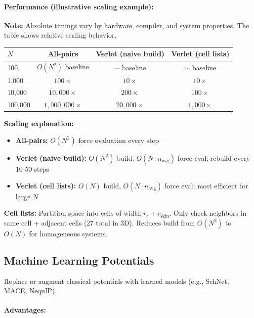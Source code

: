 \documentclass[11pt]{article}
\begin{document}
\paragraph{Performance (illustrative scaling example):}

\textbf{Note:} Absolute timings vary by hardware, compiler, and system properties. The table shows relative scaling behavior.

\begin{center}
\begin{tabular}{lccc}
\toprule
$N$ & All-pairs & Verlet (naive build) & Verlet (cell lists) \\
\midrule
100 & $O(N^2)$ baseline & $\sim$ baseline & $\sim$ baseline \\
1,000 & $100\times$ & $10\times$ & $10\times$ \\
10,000 & $10{,}000\times$ & $200\times$ & $100\times$ \\
100,000 & $1{,}000{,}000\times$ & $20{,}000\times$ & $1{,}000\times$ \\
\bottomrule
\end{tabular}
\end{center}

\textbf{Scaling explanation:}

\begin{itemize}
\item \textbf{All-pairs:} $O(N^2)$ force evaluation every step
\item \textbf{Verlet (naive build):} $O(N^2)$ build, $O(N \cdot n_{\text{avg}})$ force eval; rebuild every 10-50 steps
\item \textbf{Verlet (cell lists):} $O(N)$ build, $O(N \cdot n_{\text{avg}})$ force eval; most efficient for large $N$
\end{itemize}

\textbf{Cell lists:} Partition space into cells of width $r_c + r_{\text{skin}}$. Only check neighbors in same cell + adjacent cells (27 total in 3D). Reduces build from $O(N^2)$ to $O(N)$ for homogeneous systems.

\subsection{Machine Learning Potentials}

Replace or augment classical potentials with learned models (e.g., SchNet, MACE, NequIP).

\paragraph{Advantages:}
\end{document}
